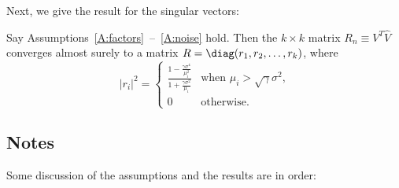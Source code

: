 Next, we give the result for the singular vectors:
\begin{theorem}\label{T:vectors}
    Say Assumptions~\ref{A:factors}~--~\ref{A:noise} hold.  Then the
    $k\times k$ matrix $R_n \equiv V^T \hat V$ converges almost surely
    to a matrix $R = \diag(r_1, r_2, \ldots, r_k)$, where
    \begin{equation}
        |r_i|^2
        =
        \begin{cases}
            \frac{ 1 - \frac{ \gamma \sigma^4 }{ \mu_i^2 } }
                 { 1 + \frac{ \gamma \sigma^2 }{ \mu_i   } }
            &\text{when $\mu_i > \sqrt{\gamma} \sigma^2$,} \\
            0
            &\text{otherwise.}
        \end{cases}
    \end{equation}
\end{theorem}


\subsection{Notes}

Some discussion of the assumptions and the results are in order:

